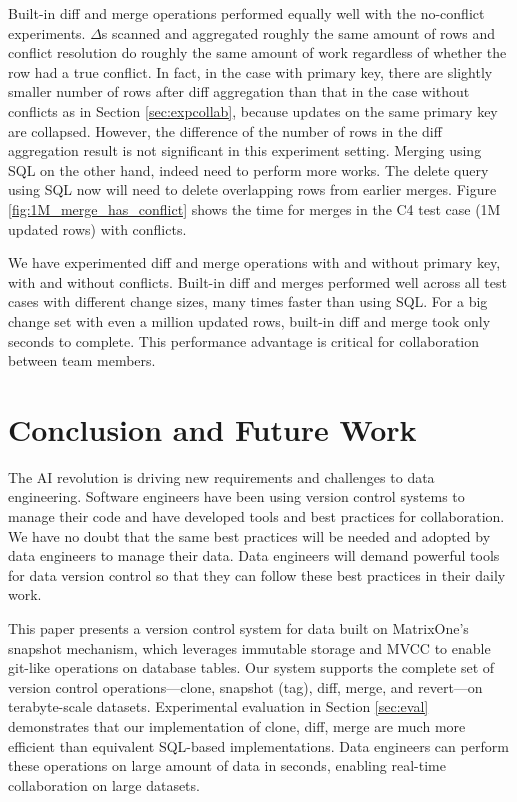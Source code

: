 \documentclass[sigconf,nonacm]{acmart} %
\begin{document}
Built-in diff and merge operations performed equally well with the 
no-conflict experiments.  $\Delta$s scanned and aggregated roughly the 
same amount of rows and conflict resolution do roughly the same amount of
work regardless of whether the row had a true conflict.  In fact, in the
case with primary key, there are slightly smaller number of rows after 
diff aggregation than that in the case without conflicts as in Section \ref{sec:expcollab},
 because updates on the same primary key are collapsed.  However, the difference of the
 number of rows in the diff aggregation result is not significant in this experiment setting.
Merging using SQL on the other hand, indeed need to perform more works. 
The delete query using SQL now will need to delete overlapping rows from 
earlier merges.  Figure \ref{fig:1M_merge_has_conflict}
shows the time for merges in the C4 test case (1M updated rows) with conflicts. 



We have experimented diff and merge operations with and without primary key,
with and without conflicts.  Built-in diff and merges performed well across 
all test cases with different change sizes, many times faster than using SQL.  
For a big change set with even a million updated rows, built-in diff and merge 
took only seconds to complete.  This performance advantage is critical for 
collaboration between team members.

\section{Conclusion and Future Work}
The AI revolution is driving new requirements and challenges 
to data engineering.  Software engineers have been using version control 
systems to manage their code and have developed tools and best practices 
for collaboration.  We have no doubt that the same best practices will be
needed and adopted by data engineers to manage their data.  
Data engineers will demand powerful tools for data version control 
so that they can follow these best practices in their daily work.

This paper presents a version control system for data built on MatrixOne's 
snapshot mechanism, which leverages immutable storage and MVCC to enable 
git-like operations on database tables. Our system supports the complete 
set of version control operations—clone, snapshot (tag), diff, merge, and 
revert—on terabyte-scale datasets. Experimental evaluation in Section \ref{sec:eval} 
demonstrates that our implementation of clone, diff, merge are much more 
efficient than equivalent SQL-based implementations.  Data engineers can 
perform these operations on large amount of data   
in seconds, enabling real-time collaboration on large datasets.
\end{document}
